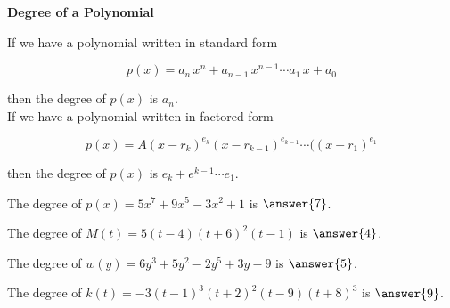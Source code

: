 \documentclass{ximera}
\author{Lee Wayand}
\begin{document}
\begin{exercise}






\begin{idea} \textbf{\textcolor{blue!55!black}{Degree of a Polynomial}}


If we have a polynomial written in standard form

\[
p(x) = a_n \, x^n + a_{n-1} \, x^{n-1} \cdots a_1 \, x + a_0
\]

then the degree of $p(x)$ is $a_n$. \\





If we have a polynomial written in factored form

\[
p(x) = A (x-r_k)^{e_k} (x-r_{k-1})^{e_{k-1}}  \cdots ((x-r_1)^{e_1}
\]

then the degree of $p(x)$ is $e_k + e^{k-1} \cdots e_1$. \\





\end{idea}



\begin{question}


The degree of $p(x) = 5x^7 + 9x^5 - 3x^2 + 1$ is $\answer{7}$.

\end{question}




\begin{question}


The degree of $M(t) = 5(t - 4) (t + 6)^2 (t - 1)$ is $\answer{4}$.

\end{question}









\begin{question}


The degree of $w(y) = 6y^3 + 5y^2 - 2y^5 + 3y - 9$ is $\answer{5}$.

\end{question}




\begin{question}


The degree of $k(t) = -3(t - 1)^3 (t + 2)^2 (t - 9) (t + 8)^3$ is $\answer{9}$.


\end{question}
\end{exercise}
\end{document}
